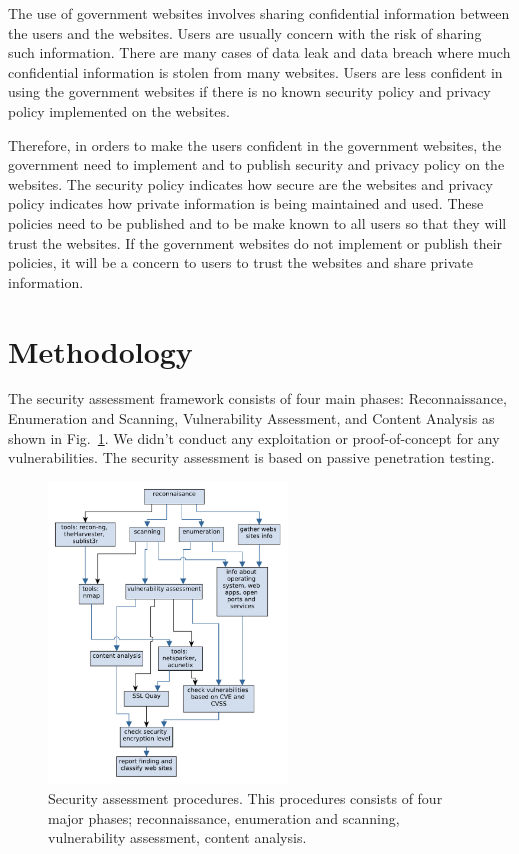 \documentclass[conference]{IEEEtran}
\begin{document}
The use of government websites involves sharing confidential information between the users and the websites. Users are usually concern with the risk of sharing such information. There are many cases of data leak and data breach where much confidential information is stolen from many websites. Users are less confident in using the government websites if there is no known security policy and privacy policy implemented on the websites\cite{zhao2010opportunities}.

Therefore, in orders to make the users confident in the government websites, the government need to implement and to publish security and privacy policy on the websites. The security policy indicates how secure are the websites and privacy policy indicates how private information is being maintained and used. These policies need to be published and to be make known to all users so that they will trust the websites. If the government websites do not implement or publish their policies, it will be a concern to users to trust the websites and share private information\cite{zhao2010opportunities}.







\section{Methodology}

The security assessment framework consists of
four main phases: Reconnaissance,
Enumeration and Scanning, Vulnerability Assessment, and Content Analysis as shown in Fig.~\ref{fig:steps}. We didn't conduct any exploitation or proof-of-concept for any vulnerabilities. The security assessment is based on passive penetration testing\cite{weidman2014penetration}.


\begin{figure}[htbp]
	\centerline{\includegraphics[width=2.5in]{steps.pdf}}
	\caption{Security assessment procedures. This procedures
		consists of
		four major phases; reconnaissance, enumeration and scanning,
		vulnerability assessment, content analysis.}
	\label{fig:steps}
\end{figure}
\end{document}
